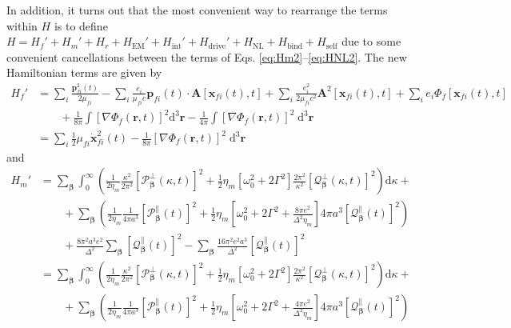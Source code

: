 \documentclass{article}
\begin{document}
In addition, it turns out that the most convenient way to rearrange the terms within $H$ is to define $H = H_f' + H_m' + H_r + H_\mathrm{EM}' + H_\mathrm{int}' + H_\mathrm{drive}' + H_\mathrm{NL} + H_\mathrm{bind} + H_\mathrm{self}$ due to some convenient cancellations between the terms of Eqs. \eqref{eq:Hm2}--\eqref{eq:HNL2}. The new Hamiltonian terms are given by
\begin{equation}
\begin{split}
H_f' &= \sum_i\frac{\mathbf{p}_{fi}^2(t)}{2\mu_{fi}} - \sum_i\frac{e_i}{\mu_{fi}c}\mathbf{p}_{fi}(t)\cdot\mathbf{A}[\mathbf{x}_{fi}(t),t] + \sum_i\frac{e_i^2}{2\mu_{fi}c^2}\mathbf{A}^2[\mathbf{x}_{fi}(t),t] + \sum_ie_i\Phi_f[\mathbf{x}_{fi}(t),t]\\
&\qquad + \frac{1}{8\pi}\int\left[\nabla\Phi_f(\mathbf{r},t)\right]^2\mathrm{d}^3\mathbf{r} - \frac{1}{4\pi}\int\left[\nabla\Phi_f(\mathbf{r},t)\right]^2\;\mathrm{d}^3\mathbf{r}\\
&= \sum_i\frac{1}{2}\mu_{fi}\dot{\mathbf{x}}^2_{fi}(t) - \frac{1}{8\pi}\left[\nabla\Phi_f(\mathbf{r},t)\right]^2\;\mathrm{d}^3\mathbf{r}
\end{split}
\end{equation}
and
\begin{equation}
\begin{split}
H_m' &= \sum_{\bm{\beta}}\int_0^\infty\left(\frac{1}{2\eta_m}\frac{\kappa^2}{2\pi^2}\left[\mathcal{P}_{\bm{\beta}}^\perp(\kappa,t)\right]^2 + \frac{1}{2}\eta_m\left[\omega_0^2 + 2\Gamma^2\right]\frac{2\pi^2}{\kappa^2}\left[\mathcal{Q}_{\bm{\beta}}^\perp(\kappa,t)\right]^2\right)\mathrm{d}\kappa + \\
&\qquad+ \sum_{\bm{\beta}}\left(\frac{1}{2\eta_m}\frac{1}{4\pi a^3}\left[\mathcal{P}_{\bm{\beta}}^\parallel(t)\right]^2 + \frac{1}{2}\eta_m\left[\omega_0^2 + 2\Gamma^2 + \frac{8\pi e^2}{\Delta^2\eta_m}\right]4\pi a^3\left[\mathcal{Q}_{\bm{\beta}}^\parallel(t)\right]^2\right)\\
&\qquad + \frac{8\pi^2a^3e^2}{\Delta^2}\sum_{\bm{\beta}}\left[\mathcal{Q}_{\bm{\beta}}^\parallel(t)\right]^2 - \sum_{\bm{\beta}}\frac{16\pi^2 e^2a^3}{\Delta^2}\left[\mathcal{Q}_{\bm{\beta}}^\parallel(t)\right]^2\\
&= \sum_{\bm{\beta}}\int_0^\infty\left(\frac{1}{2\eta_m}\frac{\kappa^2}{2\pi^2}\left[\mathcal{P}_{\bm{\beta}}^\perp(\kappa,t)\right]^2 + \frac{1}{2}\eta_m\left[\omega_0^2 + 2\Gamma^2\right]\frac{2\pi^2}{\kappa^2}\left[\mathcal{Q}_{\bm{\beta}}^\perp(\kappa,t)\right]^2\right)\mathrm{d}\kappa + \\
&\qquad+ \sum_{\bm{\beta}}\left(\frac{1}{2\eta_m}\frac{1}{4\pi a^3}\left[\mathcal{P}_{\bm{\beta}}^\parallel(t)\right]^2 + \frac{1}{2}\eta_m\left[\omega_0^2 + 2\Gamma^2 + \frac{4\pi e^2}{\Delta^2\eta_m}\right]4\pi a^3\left[\mathcal{Q}_{\bm{\beta}}^\parallel(t)\right]^2\right)\\
\end{split}
\end{equation}
\end{document}
